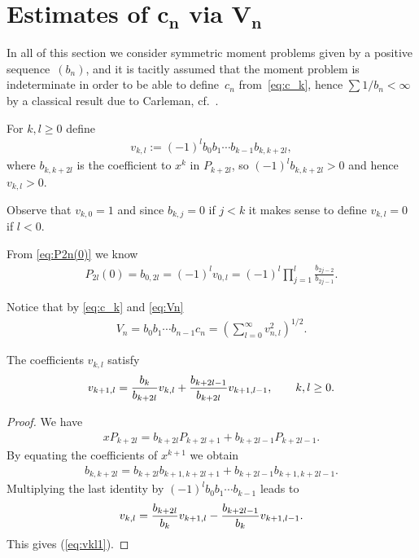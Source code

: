 \section[Estimates of $c_n$ via $V_n$]{Estimates of $\boldsymbol{c_n}$ via $\boldsymbol{V_n}$}\label{section4}

In all of this section we consider symmetric moment problems given by a positive sequence~$(b_n)$, and it is tacitly assumed that the moment problem is indeterminate in order to be able to define~$c_n$ from~\eqref{eq:c_k}, hence $\sum 1/b_n<\infty$ by a classical result due to Carleman, cf.~\cite[p.~24]{Ak}.

For $k,l\ge 0$ define
\begin{gather}\label{eq:vkl}
v_{k,l}:= (-1)^l b_0b_1\cdots b_{k-1} b_{k,k+2l},
\end{gather}
where $b_{k,k+2l}$ is the coefficient to $x^k$ in $P_{k+2l}$, so $(-1)^lb_{k,k+2l}>0$ and hence $v_{k,l}>0$.

Observe that $v_{k,0}=1$ and since $b_{k,j}=0$ if $j<k$ it makes sense to define $v_{k,l}=0$ if $l<0$.

From \eqref{eq:P2n(0)} we know
\begin{gather}\label{eq:v0l}
P_{2l}(0)=b_{0,2l}=(-1)^lv_{0,l}=(-1)^l\prod_{j=1}^l \frac{b_{2j-2}}{b_{2j-1}}.
\end{gather}

Notice that by \eqref{eq:c_k} and \eqref{eq:Vn}
\begin{gather}\label{eq:V_n1}
V_n=b_0b_1\cdots b_{n-1} c_n=\left(\sum_{l=0}^\infty v_{n,l}^2\right)^{1/2}.
\end{gather}

\begin{lem}\label{thm:vkl}
The coefficients $v_{k,l}$ satisfy
\begin{gather}\label{eq:vkl1} v_{k+1,l}={b_k\over b_{k+2l}}v_{k,l}+ {b_{k+2l-1}\over b_{k+2l}}v_{k+1,l-1},\qquad k,l\ge 0.
\end{gather}
\end{lem}

\begin{proof}We have
\begin{gather*}
x P_{k+2l}=b_{k+2l}P_{k+2l+1}+b_{k+2l-1}P_{k+2l-1}.
\end{gather*}
By equating the coefficients of $x^{k+1}$ we obtain
\begin{gather*}
b_{k,k+2l}=b_{k+2l}b_{k+1,k+2l+1}+ b_{k+2l-1}b_{k+1,k+2l-1}.
\end{gather*}
Multiplying the last identity by $(-1)^lb_0b_1\cdots b_{k-1}$ leads to
\begin{gather*}
 v_{k,l}={b_{k+2l}\over b_k}v_{k+1,l}- { b_{k+2l-1}\over b_k}v_{k+1,l-1}.
\end{gather*}
 This gives (\ref{eq:vkl1}).
\end{proof}

